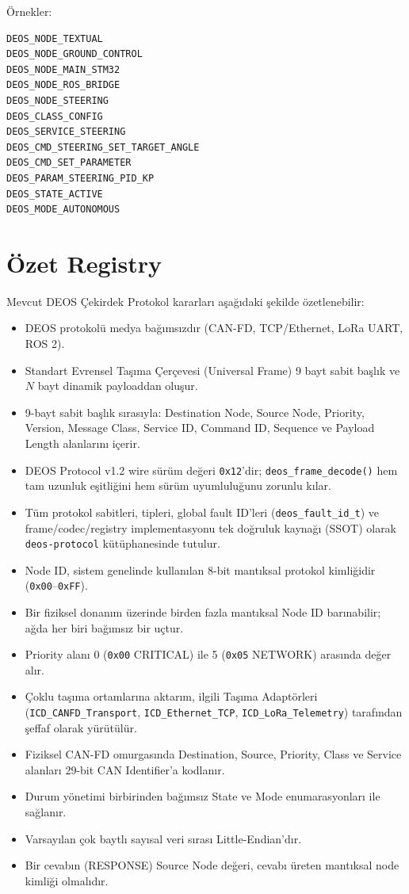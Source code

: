 \documentclass[a4paper,10pt]{article}
\newcommand{\hex}[1]{\texttt{0x#1}}
\newcommand{\code}[1]{\texttt{#1}}
\begin{document}
Örnekler:

\begin{verbatim}
DEOS_NODE_TEXTUAL
DEOS_NODE_GROUND_CONTROL
DEOS_NODE_MAIN_STM32
DEOS_NODE_ROS_BRIDGE
DEOS_NODE_STEERING
DEOS_CLASS_CONFIG
DEOS_SERVICE_STEERING
DEOS_CMD_STEERING_SET_TARGET_ANGLE
DEOS_CMD_SET_PARAMETER
DEOS_PARAM_STEERING_PID_KP
DEOS_STATE_ACTIVE
DEOS_MODE_AUTONOMOUS
\end{verbatim}


\section{Özet Registry}

Mevcut DEOS Çekirdek Protokol kararları aşağıdaki şekilde özetlenebilir:

\begin{itemize}
    \item DEOS protokolü medya bağımsızdır (CAN-FD, TCP/Ethernet, LoRa UART, ROS 2).
    \item Standart Evrensel Taşıma Çerçevesi (Universal Frame) 9 bayt sabit başlık ve $N$ bayt dinamik payloaddan oluşur.
    \item 9-bayt sabit başlık sırasıyla: Destination Node, Source Node, Priority, Version, Message Class, Service ID, Command ID, Sequence ve Payload Length alanlarını içerir.
    \item DEOS Protocol v1.2 wire sürüm değeri \hex{12}'dir; \code{deos\_frame\_decode()} hem tam uzunluk eşitliğini hem sürüm uyumluluğunu zorunlu kılar.
    \item Tüm protokol sabitleri, tipleri, global fault ID'leri (\code{deos\_fault\_id\_t}) ve frame/codec/registry implementasyonu tek doğruluk kaynağı (SSOT) olarak \code{deos-protocol} kütüphanesinde tutulur.
    \item Node ID, sistem genelinde kullanılan 8-bit mantıksal protokol kimliğidir (\hex{00}--\hex{FF}).
    \item Bir fiziksel donanım üzerinde birden fazla mantıksal Node ID barınabilir; ağda her biri bağımsız bir uçtur.
    \item Priority alanı 0 (\hex{00} CRITICAL) ile 5 (\hex{05} NETWORK) arasında değer alır.
    \item Çoklu taşıma ortamlarına aktarım, ilgili Taşıma Adaptörleri (\code{ICD\_CANFD\_Transport}, \code{ICD\_Ethernet\_TCP}, \code{ICD\_LoRa\_Telemetry}) tarafından şeffaf olarak yürütülür.
    \item Fiziksel CAN-FD omurgasında Destination, Source, Priority, Class ve Service alanları 29-bit CAN Identifier'a kodlanır.
    \item Durum yönetimi birbirinden bağımsız State ve Mode enumarasyonları ile sağlanır.
    \item Varsayılan çok baytlı sayısal veri sırası Little-Endian'dır.
    \item Bir cevabın (RESPONSE) Source Node değeri, cevabı üreten mantıksal node kimliği olmalıdır.
\end{itemize}
\end{document}
